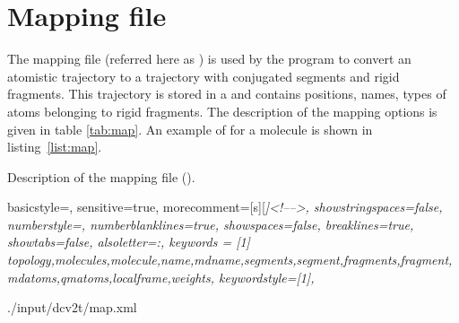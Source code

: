 \section{Mapping file}
\label{sec:xmlmap}
The mapping file (referred here as \xmlcsg) is used by the program \ctpmap to convert an atomistic trajectory to a trajectory with conjugated segments and rigid fragments. 
This trajectory is stored in a  and contains positions, names, types of atoms belonging to rigid fragments. 
The description of the mapping options is given in table \ref{tab:map}. An example of \xmlcsg for a \dcvt molecule is shown in listing~\ref{list:map}. 
%
\begin{table}[h]
\label{tab:map}
\caption{Description of the \xml mapping file (\xmlcsg).}
 {\footnotesize }
\end{table}
%
 {
   basicstyle=\ttfamily\scriptsize,
   sensitive=true,
   morecomment=[s][\color{gray}\rmfamily\itshape]{<!--}{-->}, 
   showstringspaces=false,
   numberstyle=\scriptsize,
   numberblanklines=true,
   showspaces=false,
   breaklines=true,
   showtabs=false,
   alsoletter={:},
   keywords = [1]
   { topology,molecules,molecule,name,mdname,segments,segment,fragments,fragment,mdatoms,qmatoms,localframe,weights},
   keywordstyle={[1]\color{blue}},
}

%
{./input/dcv2t/map.xml}
